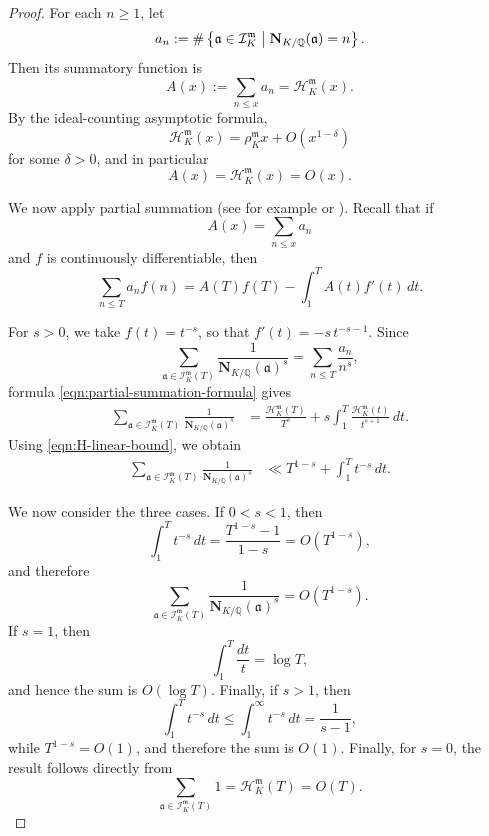 \documentclass[11pt, reqno]{amsart}
\numberwithin{equation}{section}
\newcommand{\suchthat}{\;\ifnum\currentgrouptype=16 \middle\fi|\;}
\newcommand{\Q}{\mathbb{Q}}
\newcommand{\Nrm}[2]{\mathbf{N}_{#1}(#2)}
\theoremstyle{definition}
\begin{document}
\begin{proof}
For each $n\geq1$, let
\[
a_n
:=
\#\left\{
\mathfrak{a}\in\mathcal{I}_K^{\mathfrak{m}}
\suchthat
\Nrm{K/\Q}{\mathfrak{a}}=n
\right\}.
\]
Then its summatory function is
\[
A(x)
:=
\sum_{n\leq x}a_n
=
\mathcal{H}_K^{\mathfrak{m}}(x).
\]
By the ideal-counting asymptotic formula,
\[
\mathcal{H}_K^{\mathfrak{m}}(x)
=
\rho_K^{\mathfrak{m}}x
+
O\left(x^{1-\delta}\right)
\]
for some $\delta>0$, and in particular
\begin{equation}\label{eqn:H-linear-bound}
A(x)=\mathcal{H}_K^{\mathfrak{m}}(x)=O(x).
\end{equation}

We now apply partial summation (see for example \cite[\S 1.5]{iwaniec-kowalski2004} or \cite[Chapter 1]{montgomery-vaughan2007}). Recall that if
\[
A(x)=\sum_{n\leq x}a_n
\]
and $f$ is continuously differentiable, then
\begin{equation}\label{eqn:partial-summation-formula}
\sum_{n\leq T}a_n f(n)
=
A(T)f(T)
-
\int_1^T A(t)f'(t)\,dt.
\end{equation}

For $s>0$, we take $f(t)=t^{-s}$, so that $f'(t)=-s\,t^{-s-1}$.
Since
\[
\sum_{\mathfrak{a}\in\mathcal{I}_K^{\mathfrak{m}}(T)}
\frac{1}{\Nrm{K/\Q}{\mathfrak{a}}^s}
=
\sum_{n\leq T}\frac{a_n}{n^s},
\]
formula \eqref{eqn:partial-summation-formula} gives
\begin{align}
\sum_{\mathfrak{a}\in\mathcal{I}_K^{\mathfrak{m}}(T)}
\frac{1}{\Nrm{K/\Q}{\mathfrak{a}}^s}
&=
\frac{\mathcal{H}_K^{\mathfrak{m}}(T)}{T^s}
+
s\int_1^T
\frac{\mathcal{H}_K^{\mathfrak{m}}(t)}
{t^{s+1}}\,dt.
\label{eqn:partial-summation-ideal-sum}
\end{align}
Using \eqref{eqn:H-linear-bound}, we obtain
\begin{align*}
\sum_{\mathfrak{a}\in\mathcal{I}_K^{\mathfrak{m}}(T)}
\frac{1}{\Nrm{K/\Q}{\mathfrak{a}}^s}
&\ll
T^{1-s}
+
\int_1^T t^{-s}\,dt.
\end{align*}

We now consider the three cases. If $0<s<1$, then
\[
\int_1^T t^{-s}\,dt
=
\frac{T^{1-s}-1}{1-s}
=
O(T^{1-s}),
\]
and therefore
\[
\sum_{\mathfrak{a}\in\mathcal{I}_K^{\mathfrak{m}}(T)}
\frac{1}{\Nrm{K/\Q}{\mathfrak{a}}^s}
=
O(T^{1-s}).
\]
If $s=1$, then
\[
\int_1^T\frac{dt}{t}=\log T,
\]
and hence the sum is $O(\log T)$. Finally, if $s>1$, then
\[
\int_1^T t^{-s}\,dt
\leq
\int_1^\infty t^{-s}\,dt
=
\frac{1}{s-1},
\]
while $T^{1-s}=O(1)$, and therefore the sum is $O(1)$. Finally, for $s=0$, the result follows directly from
$$
\sum_{\mathfrak{a}\in\mathcal{I}_K^{\mathfrak{m}}(T)}1
=
\mathcal{H}_K^{\mathfrak{m}}(T)
=
O(T).
$$
\end{proof}
\end{document}
